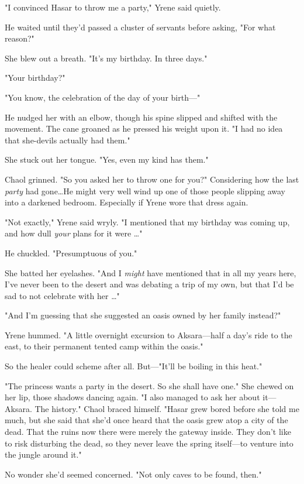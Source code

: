 "I convinced Hasar to throw me a party," Yrene said quietly.

He waited until they'd passed a cluster of servants before asking, "For what reason?"

She blew out a breath.
"It's my birthday.
In three days."

"Your birthday?"

"You know, the celebration of the day of your birth---"

He nudged her with an elbow, though his spine slipped and shifted with the movement.
The cane groaned as he pressed his weight upon it.
"I had no idea that she-devils actually had them."

She stuck out her tongue.
"Yes, even my kind has them."

Chaol grinned.
"So you asked her to throw one for you?"
Considering how the last \emph{party} had gone\ldots He might very well wind up one of those people slipping away into a darkened bedroom.
Especially if Yrene wore that dress again.

"Not exactly," Yrene said wryly.
"I mentioned that my birthday was coming up, and how dull \emph{your} plans for it were \ldots"

He chuckled.
"Presumptuous of you."

She batted her eyelashes.
"And I \emph{might} have mentioned that in all my years here, I've never been to the desert and was debating a trip of my own, but that I'd be sad to not celebrate with her \ldots"

"And I'm guessing that she suggested an oasis owned by her family instead?"

Yrene hummed.
"A little overnight excursion to Aksara---half a day's ride to the east, to their permanent tented camp within the oasis."

So the healer could scheme after all.
But---"It'll be boiling in this heat."

"The princess wants a party in the desert.
So she shall have one."
She chewed on her lip, those shadows dancing again.
"I also managed to ask her about it--- Aksara.
The history."
Chaol braced himself.
"Hasar grew bored before she told me much, but she said that she'd once heard that the oasis grew atop a city of the dead.
That the ruins now there were merely the gateway inside.
They don't like to risk disturbing the dead, so they never leave the spring itself---to venture into the jungle around it."

No wonder she'd seemed concerned.
"Not only caves to be found, then."

